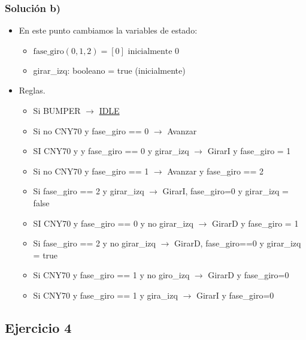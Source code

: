 \subsubsection*{Solución b)}

\begin{itemize}
    \item En este punto cambiamos la variables de estado: \begin{itemize}
        \item $\text{fase\_giro}(0,1,2) = [0] \text{ inicialmente 0}$
        \item girar\_izq: booleano = true (inicialmente)
    \end{itemize}
    \item Reglas.
    \begin{itemize}
        \item Si BUMPER $\rightarrow$ \underline{IDLE}
        \item Si no CNY70 y fase\_giro == 0 $\rightarrow$ Avanzar
        \item SI CNY70 y y fase\_giro == 0 y girar\_izq $\rightarrow$ GirarI y fase\_giro = 1
        \item Si no CNY70 y fase\_giro == 1 $\rightarrow$ Avanzar y fase\_giro == 2
        \item Si fase\_giro == 2 y girar\_izq $\rightarrow$ GirarI, fase\_giro=0 y girar\_izq = false 
        \item SI CNY70 y fase\_giro == 0 y no girar\_izq $\rightarrow$ GirarD y fase\_giro = 1
        \item Si fase\_giro == 2 y no girar\_izq $\rightarrow$ GirarD, fase\_giro==0 y girar\_izq = true
        \item Si CNY70 y fase\_giro == 1 y no giro\_izq $\rightarrow$ GirarD y fase\_giro=0
        \item Si CNY70 y fase\_giro == 1 y gira\_izq $\rightarrow$ GirarI y fase\_giro=0
    \end{itemize}
\end{itemize}






\subsection*{Ejercicio 4}

